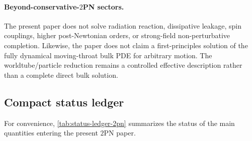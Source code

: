 \documentclass[11pt]{article}
\newcommand{\TwoPN}{\mathrm{2PN}}
\begin{document}
\paragraph{Beyond-conservative-\texorpdfstring{$2$}{2}PN sectors.}
The present paper does not solve radiation reaction, dissipative leakage, spin couplings,
higher post-Newtonian orders, or strong-field non-perturbative completion.
Likewise, the paper does not claim a first-principles solution of the fully dynamical
moving-throat bulk PDE for arbitrary motion.
The worldtube/particle reduction remains a controlled effective description rather than a
complete direct bulk solution.

\subsection{Compact status ledger}
\label{sec:status-ledger-table}

For convenience, \cref{tab:status-ledger-2pn} summarizes the status of the main
quantities entering the present \(\TwoPN\) paper.
\end{document}

